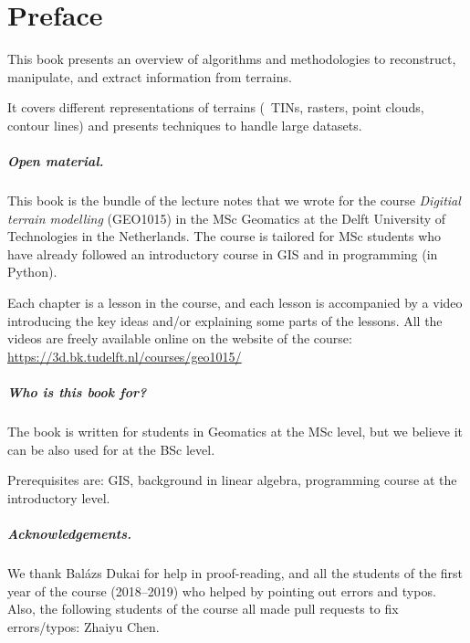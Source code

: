 


\chapter*{Preface}

This book presents an overview of algorithms and methodologies to reconstruct, manipulate, and extract information from terrains.

It covers different representations of terrains (\eg\ TINs, rasters, point clouds, contour lines) and presents techniques to handle large datasets.



\paragraph*{Open material.}
This book is the bundle of the lecture notes that we wrote for the course \emph{Digitial terrain modelling} (GEO1015) in the MSc Geomatics at the Delft University of Technologies in the Netherlands.
The course is tailored for MSc students who have already followed an introductory course in GIS and in programming (in Python).

Each chapter is a lesson in the course, and each lesson is accompanied by a video introducing the key ideas and/or explaining some parts of the lessons.
All the videos are freely available online on the website of the course: \url{https://3d.bk.tudelft.nl/courses/geo1015/}


\paragraph*{Who is this book for?}
The book is written for students in Geomatics at the MSc level, but we believe it can be also used for at the BSc level.

Prerequisites are: GIS, background in linear algebra, programming course at the introductory level.


\paragraph*{Acknowledgements.}
We thank Balázs Dukai for help in proof-reading, and all the students of the first year of the course (2018--2019) who helped by pointing out errors and typos.
Also, the following students of the course all made pull requests to fix errors/typos: Zhaiyu Chen.







